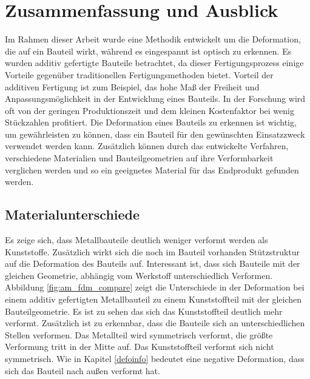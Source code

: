 
\chapter{Zusammenfassung und Ausblick}

Im Rahmen dieser Arbeit wurde eine Methodik entwickelt um 
die Deformation, die auf ein Bauteil wirkt, während es eingespannt 
ist optisch zu erkennen. Es wurden additiv gefertigte Bauteile 
betrachtet, da dieser Fertigungsprozess einige Vorteile gegenüber
traditionellen Fertigungsmethoden bietet. 
Vorteil der additiven Fertigung ist zum Beispiel, das hohe Maß der Freiheit und 
Anpassungsmöglichkeit in der Entwicklung eines Bauteils. In der Forschung 
wird oft von der geringen Produktionszeit und dem kleinen Kostenfaktor 
bei wenig Stückzahlen profitiert. Die Deformation eines Bauteils zu 
erkennen ist wichtig, um gewährleisten zu können, dass ein Bauteil für 
den gewünschten Einsatzzweck verwendet werden kann. Zusätzlich können 
durch das entwickelte Verfahren, verschiedene Materialien und Bauteilgeometrien 
auf ihre Verformbarkeit verglichen werden und so ein geeignetes Material 
für das Endprodukt gefunden werden.

\section{Materialunterschiede}

Es zeige sich, dass Metallbauteile deutlich weniger verformt werden als 
Kunststoffe. Zusätzlich wirkt sich die noch im Bauteil vorhanden Stützstruktur 
auf die Deformation des Bauteils auf. 
Interessant ist, dass sich Bauteile mit der gleichen Geometrie, abhängig vom 
Werkstoff unterschiedlich Verformen.
Abbildung \ref{fig:am_fdm_compare} zeigt die Unterschiede in der Deformation 
bei einem additiv gefertigten Metallbauteil zu einem Kunststoffteil mit der gleichen 
Bauteilgeometrie. Es ist zu sehen das sich das Kunststoffteil deutlich mehr verformt.
Zusätzlich ist zu erkennbar, dass die Bauteile sich an unterschiedlichen Stellen verformen.
Das Metallteil wird symmetrisch verformt, die größte Verformung tritt in der Mitte auf.
Das Kunststoffteil verformt sich nicht symmetrisch. Wie in Kapitel \ref{defoinfo} 
bedeutet eine negative Deformation, dass sich das Bauteil nach außen verformt hat.

